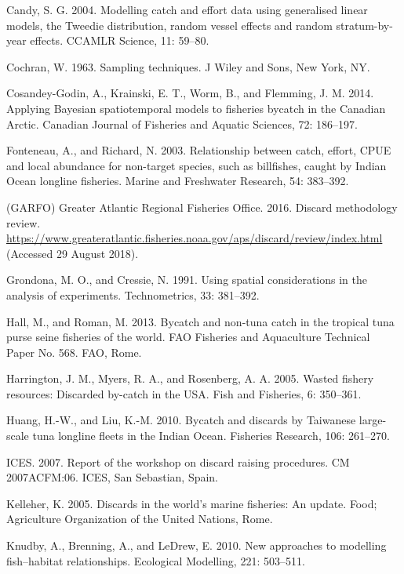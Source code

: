 \documentclass[]{article}
\begin{document}
\hypertarget{ref-candy2004}{}
Candy, S. G. 2004. Modelling catch and effort data using generalised
linear models, the Tweedie distribution, random vessel effects and
random stratum-by-year effects. CCAMLR Science, 11: 59--80.

\hypertarget{ref-cochran1963}{}
Cochran, W. 1963. Sampling techniques. J Wiley and Sons, New York, NY.

\hypertarget{ref-cosandey-godin2014}{}
Cosandey-Godin, A., Krainski, E. T., Worm, B., and Flemming, J. M. 2014.
Applying Bayesian spatiotemporal models to fisheries bycatch in the
Canadian Arctic. Canadian Journal of Fisheries and Aquatic Sciences, 72:
186--197.

\hypertarget{ref-fonteneau2003}{}
Fonteneau, A., and Richard, N. 2003. Relationship between catch, effort,
CPUE and local abundance for non-target species, such as billfishes,
caught by Indian Ocean longline fisheries. Marine and Freshwater
Research, 54: 383--392.

\hypertarget{ref-garfo2016}{}
(GARFO) Greater Atlantic Regional Fisheries Office. 2016. Discard
methodology review.
\url{https://www.greateratlantic.fisheries.noaa.gov/aps/discard/review/index.html}
(Accessed 29 August 2018).

\hypertarget{ref-grondona1991}{}
Grondona, M. O., and Cressie, N. 1991. Using spatial considerations in
the analysis of experiments. Technometrics, 33: 381--392.

\hypertarget{ref-hall2013}{}
Hall, M., and Roman, M. 2013. Bycatch and non-tuna catch in the tropical
tuna purse seine fisheries of the world. FAO Fisheries and Aquaculture
Technical Paper No. 568. FAO, Rome.

\hypertarget{ref-harrington2005}{}
Harrington, J. M., Myers, R. A., and Rosenberg, A. A. 2005. Wasted
fishery resources: Discarded by-catch in the USA. Fish and Fisheries, 6:
350--361.

\hypertarget{ref-huang2010}{}
Huang, H.-W., and Liu, K.-M. 2010. Bycatch and discards by Taiwanese
large-scale tuna longline fleets in the Indian Ocean. Fisheries
Research, 106: 261--270.

\hypertarget{ref-ices2007}{}
ICES. 2007. Report of the workshop on discard raising procedures. CM
2007ACFM:06. ICES, San Sebastian, Spain.

\hypertarget{ref-kelleher2005}{}
Kelleher, K. 2005. Discards in the world's marine fisheries: An update.
Food; Agriculture Organization of the United Nations, Rome.

\hypertarget{ref-knudby2010}{}
Knudby, A., Brenning, A., and LeDrew, E. 2010. New approaches to
modelling fish--habitat relationships. Ecological Modelling, 221:
503--511.
\end{document}

